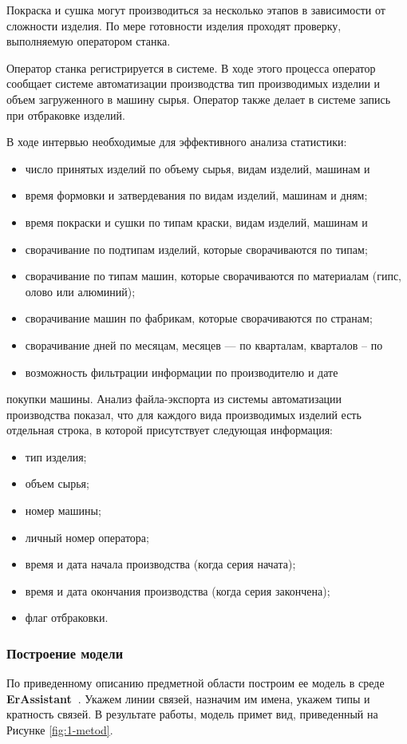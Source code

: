 \documentclass[a4paper,14pt]{extarticle}
\newcommand{\erassistant}{\textbf{ErAssistant~}}
\begin{document}
Покраска и сушка могут производиться за несколько этапов в зависимости
от сложности изделия. По мере готовности изделия проходят проверку,
выполняемую оператором станка.

Оператор станка регистрируется в системе. В ходе этого процесса оператор
сообщает системе автоматизации производства тип производимых изделии и
объем загруженного в машину сырья. Оператор также делает в системе запись
при отбраковке изделий.

В ходе
интервью необходимые для эффективного анализа статистики:
\begin{itemize}

\item  число принятых изделий по объему сырья, видам изделий, машинам и
\item  время формовки и затвердевания по видам изделий, машинам и дням;
\item  время покраски и сушки по типам краски, видам изделий, машинам и
\item  сворачивание по подтипам изделий, которые сворачиваются по типам;
\item  сворачивание по типам машин, которые сворачиваются по материалам
(гипс, олово или алюминий);
\item  сворачивание машин по фабрикам, которые сворачиваются по странам;
\item  сворачивание дней по месяцам, месяцев — по кварталам, кварталов – по
\item  возможность фильтрации информации по производителю и дате
\end{itemize}
покупки машины.
Анализ файла-экспорта из системы автоматизации производства показал,
что для каждого вида производимых изделий есть отдельная строка, в которой
присутствует следующая информация:
\begin{itemize}
	\item  тип изделия;
	\item  объем сырья;
	\item  номер машины;
	\item  личный номер оператора;
	\item  время и дата начала производства (когда серия начата);
	\item  время и дата окончания производства (когда серия закончена);
	\item  флаг отбраковки.
\end{itemize}
\subsubsection*{Построение модели}
По приведенному описанию предметной области построим ее модель в среде \erassistant. Укажем линии связей, назначим им имена, укажем типы и кратность связей. В результате работы, модель примет вид, приведенный на Рисунке \ref{fig:1-metod}.
\end{document}
